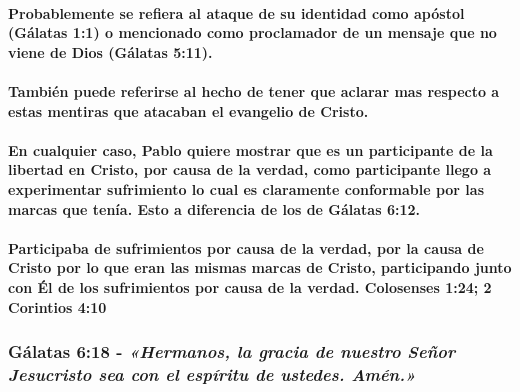\documentclass[11a pt,twoside]{article}
\newcommand{\scripture}[1]{%
  {\fontsize{12pt}{16pt}\selectfont\ScriptureFont\itshape #1}%
}
\let\oldsubsubsection\subsubsection
\renewcommand{\subsubsection}{\needspace{4\baselineskip}\oldsubsubsection}
\let\oldparagraph\paragraph
\renewcommand{\paragraph}{\needspace{3\baselineskip}\oldparagraph}
\begin{document}
\paragraph{Probablemente se refiera al ataque de su identidad como
apóstol (Gálatas 1:1) o mencionado como proclamador de un mensaje que no
viene de Dios (Gálatas
5:11).}\label{probablemente-se-refiera-al-ataque-de-su-identidad-como-apuxf3stol-guxe1latas-11-o-mencionado-como-proclamador-de-un-mensaje-que-no-viene-de-dios-guxe1latas-511.}

\paragraph{También puede referirse al hecho de tener que aclarar mas
respecto a estas mentiras que atacaban el evangelio de
Cristo.}\label{tambiuxe9n-puede-referirse-al-hecho-de-tener-que-aclarar-mas-respecto-a-estas-mentiras-que-atacaban-el-evangelio-de-cristo.}

\paragraph{En cualquier caso, Pablo quiere mostrar que es un
participante de la libertad en Cristo, por causa de la verdad, como
participante llego a experimentar sufrimiento lo cual es claramente
conformable por las marcas que tenía. Esto a diferencia de los de
Gálatas
6:12.}\label{en-cualquier-caso-pablo-quiere-mostrar-que-es-un-participante-de-la-libertad-en-cristo-por-causa-de-la-verdad-como-participante-llego-a-experimentar-sufrimiento-lo-cual-es-claramente-conformable-por-las-marcas-que-tenuxeda.-esto-a-diferencia-de-los-de-guxe1latas-612.}

\paragraph{Participaba de sufrimientos por causa de la verdad, por la
causa de Cristo por lo que eran las mismas marcas de Cristo,
participando junto con Él de los sufrimientos por causa de la verdad.
Colosenses 1:24; 2 Corintios
4:10}\label{participaba-de-sufrimientos-por-causa-de-la-verdad-por-la-causa-de-cristo-por-lo-que-eran-las-mismas-marcas-de-cristo-participando-junto-con-uxe9l-de-los-sufrimientos-por-causa-de-la-verdad.-colosenses-124-2-corintios-410}

\subsubsection{\texorpdfstring{Gálatas 6:18 -
\scripture{«Hermanos, la gracia de nuestro Señor Jesucristo sea con el espíritu de ustedes. Amén.»}}{Gálatas 6:18 - }}\label{guxe1latas-618---hermanos-la-gracia-de-nuestro-seuxf1or-jesucristo-sea-con-el-espuxedritu-de-ustedes.-amuxe9n.}
\end{document}
